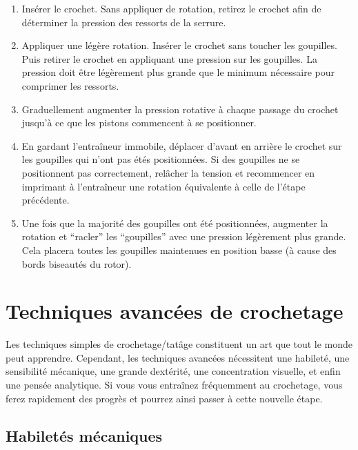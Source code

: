 \documentclass[a4paper,french,11pt,twoside]{report}
\begin{document}
\begin{enumerate}
    \item{Insérer le crochet. Sans appliquer de rotation, retirez le crochet afin de déterminer la pression des ressorts de la serrure.}
    \item{Appliquer une légère rotation. Insérer le crochet sans  toucher les goupilles. Puis retirer le crochet en appliquant une  pression sur les goupilles. La pression doit être légèrement plus grande  que le minimum nécessaire pour comprimer les ressorts.}
    \item{Graduellement augmenter la pression rotative à chaque passage du crochet jusqu'à ce que les pistons commencent à se positionner.}
    \item{En gardant l'entraîneur immobile, déplacer d'avant en  arrière le crochet sur les goupilles qui n'ont pas étés positionnées. Si  des goupilles ne se positionnent pas correctement, relâcher la tension  et recommencer en imprimant à l'entraîneur une rotation équivalente à  celle de l'étape précédente.}
    \item{Une fois que la majorité des goupilles ont été  positionnées, augmenter la rotation et \enquote{racler} les  \enquote{goupilles} avec une pression légèrement plus grande. Cela  placera toutes les goupilles maintenues en position basse (à cause des bords biseautés du rotor).}
\end{enumerate}

\chapter{Techniques avancées de crochetage}

Les techniques simples de crochetage/tatâge constituent un art que tout le monde peut apprendre. Cependant, les techniques avancées nécessitent une habileté, une sensibilité mécanique, une grande dextérité, une concentration visuelle, et enfin une pensée analytique. Si vous vous entraînez fréquemment au crochetage, vous ferez rapidement des progrès et pourrez ainsi passer à cette nouvelle étape.

\section{Habiletés mécaniques}
\end{document}
